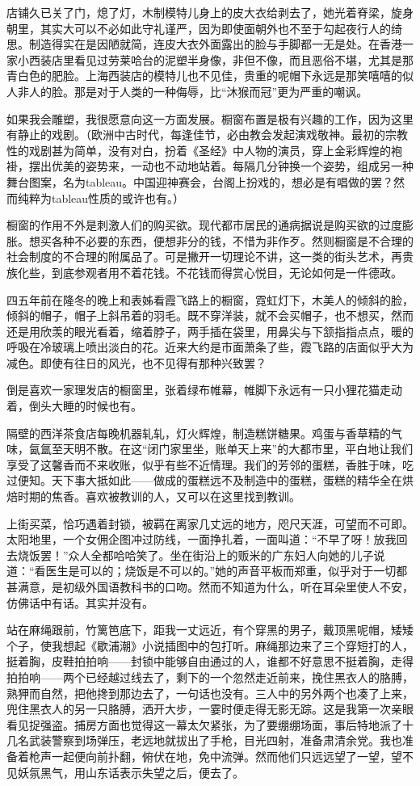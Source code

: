 \par 店铺久已关了门，熄了灯，木制模特儿身上的皮大衣给剥去了，她光着脊梁，旋身朝里，其实大可以不必如此守礼谨严，因为即使面朝外也不至于勾起夜行人的绮思。制造得实在是因陋就简，连皮大衣外面露出的脸与手脚都一无是处。在香港一家小西装店里看见过劳莱哈台的泥塑半身像，非但不像，而且恶俗不堪，尤其是那青白色的肥脸。上海西装店的模特儿也不见佳，贵重的呢帽下永远是那笑嘻嘻的似人非人的脸。那是对于人类的一种侮辱，比“沐猴而冠”更为严重的嘲讽。
\par 如果我会雕塑，我很愿意向这一方面发展。橱窗布置是极有兴趣的工作，因为这里有静止的戏剧。（欧洲中古时代，每逢佳节，必由教会发起演戏敬神。最初的宗教性的戏剧甚为简单，没有对白，扮着《圣经》中人物的演员，穿上金彩辉煌的袍褂，摆出优美的姿势来，一动也不动地站着。每隔几分钟换一个姿势，组成另一种舞台图案，名为tableau。中国迎神赛会，台阁上扮戏的，想必是有唱做的罢？然而纯粹为tableau性质的或许也有。）
\par 橱窗的作用不外是刺激人们的购买欲。现代都市居民的通病据说是购买欲的过度膨胀。想买各种不必要的东西，便想非分的钱，不惜为非作歹。然则橱窗是不合理的社会制度的不合理的附属品了。可是撇开一切理论不讲，这一类的街头艺术，再贵族化些，到底参观者用不着花钱。不花钱而得赏心悦目，无论如何是一件德政。
\par 四五年前在隆冬的晚上和表姊看霞飞路上的橱窗，霓虹灯下，木美人的倾斜的脸，倾斜的帽子，帽子上斜吊着的羽毛。既不穿洋装，就不会买帽子，也不想买，然而还是用欣羡的眼光看着，缩着脖子，两手插在袋里，用鼻尖与下颔指指点点，暖的呼吸在冷玻璃上喷出淡白的花。近来大约是市面萧条了些，霞飞路的店面似乎大为减色。即使有往日的风光，也不见得有那种兴致罢？
\par 倒是喜欢一家理发店的橱窗里，张着绿布帷幕，帷脚下永远有一只小狸花猫走动着，倒头大睡的时候也有。
\par 隔壁的西洋茶食店每晚机器轧轧，灯火辉煌，制造糕饼糖果。鸡蛋与香草精的气味，氤氲至天明不散。在这“闭门家里坐，账单天上来”的大都市里，平白地让我们享受了这馨香而不来收账，似乎有些不近情理。我们的芳邻的蛋糕，香胜于味，吃过便知。天下事大抵如此——做成的蛋糕远不及制造中的蛋糕，蛋糕的精华全在烘焙时期的焦香。喜欢被教训的人，又可以在这里找到教训。
\par 上街买菜，恰巧遇着封锁，被羁在离家几丈远的地方，咫尺天涯，可望而不可即。太阳地里，一个女佣企图冲过防线，一面挣扎着，一面叫道：“不早了呀！放我回去烧饭罢！”众人全都哈哈笑了。坐在街沿上的贩米的广东妇人向她的儿子说道：“看医生是可以的；烧饭是不可以的。”她的声音平板而郑重，似乎对于一切都甚满意，是初级外国语教科书的口吻。然而不知道为什么，听在耳朵里使人不安，仿佛话中有话。其实并没有。
\par 站在麻绳跟前，竹篱笆底下，距我一丈远近，有个穿黑的男子，戴顶黑呢帽，矮矮个子，使我想起《歇浦潮》小说插图中的包打听。麻绳那边来了三个穿短打的人，挺着胸，皮鞋拍拍响——封锁中能够自由通过的人，谁都不好意思不挺着胸，走得拍拍响——两个已经越过线去了，剩下的一个忽然走近前来，挽住黑衣人的胳膊，熟狎而自然，把他搀到那边去了，一句话也没有。三人中的另外两个也凑了上来，兜住黑衣人的另一只胳膊，洒开大步，一霎时便走得无影无踪。这是我第一次亲眼看见捉强盗。捕房方面也觉得这一幕太欠紧张，为了要绷绷场面，事后特地派了十几名武装警察到场弹压，老远地就拔出了手枪，目光四射，准备肃清余党。我也准备着枪声一起便向前扑翻，俯伏在地，免中流弹。然而他们只远远望了一望，望不见妖氛黑气，用山东话表示失望之后，便去了。
